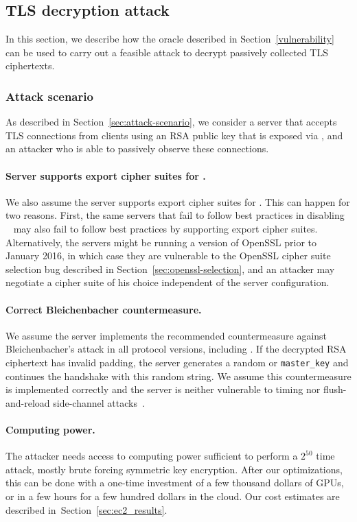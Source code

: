 \subsection{TLS decryption attack}

In this section, we describe how the oracle described in Section~\ref{vulnerability} can be used to carry out a feasible attack to decrypt passively collected TLS ciphertexts.

\subsubsection{Attack scenario}
As described in Section~\ref{sec:attack-scenario}, we consider a server that accepts TLS connections from clients using an RSA public key that is exposed via \ssltwo, and an attacker who is able to passively observe these connections.

\paragraph{Server supports export cipher suites for \ssltwo.}
We also assume the server supports export cipher suites for \ssltwo.
This can happen for two reasons.
First, the same servers that fail to follow best practices in disabling \ssltwo~\cite{ProhibitingSSLv2} may also fail to follow best practices by supporting export cipher suites.
Alternatively, the servers might be running a version of OpenSSL prior to January 2016, in which case they are vulnerable to the OpenSSL cipher suite selection bug described in Section~\ref{sec:openssl-selection}, and an attacker may negotiate a cipher suite of his choice independent of the server configuration.

\paragraph{Correct Bleichenbacher countermeasure.}
We assume the server implements the recommended countermeasure against Bleichenbacher's attack in all protocol versions, including \ssltwo. If the decrypted RSA ciphertext has invalid padding, the server generates a random \pms or \texttt{master\_key} and continues the handshake with this random string. We assume this countermeasure is implemented correctly and the server is neither vulnerable to timing nor flush-and-reload side-channel attacks~\cite{Meyer14,Zhang:2014:CSA:2660267.2660356}.

\paragraph{Computing power.}
The attacker needs access to computing power sufficient to perform a $2^{50}$ time attack, mostly brute forcing symmetric key encryption.  After our optimizations, this can be done with a one-time investment of a few thousand dollars of GPUs, or in a few hours for a few hundred dollars in the cloud.  Our cost estimates are described in~Section~\ref{sec:ec2_results}.

